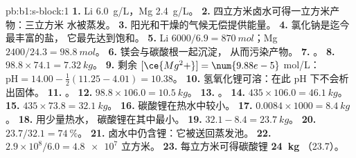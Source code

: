 \begin{solution}{pb:b1:s-block:1}
\textbf{1.} Li \qty{6.0}{g/L}，Mg \qty{2.4}{g/L}。
\textbf{2.} 四立方米卤水可得一立方米产物：三立方米
水被蒸发。
\textbf{3.} 阳光和干燥的气候无偿提供能量。
\textbf{4.} 氯化钠是迄今最丰富的盐，
它最先达到饱和。
\textbf{5.} Li $6000/6.9 = \qty{870}{mol}$；Mg $2400/24.3 = \qty{98.8}{mol}$。
\textbf{6.} 镁会与碳酸根一起沉淀，
从而污染产物。
\textbf{7.} 。
\textbf{8.} $98.8 \times 74.1 = \qty{7.32}{kg}$。
\textbf{9.} 剩余 $[\ce{Mg^2+}] = \num{9.88e-5}$ mol/L：$\mathrm{pH} = 14.00 -
\frac12(11.25 - 4.01) = 10.38$。
\textbf{10.} 氢氧化锂可溶：在此 pH 下不会析出固体。
\textbf{11.} 。
\textbf{12.} $98.8 \times 106.0 = \qty{10.5}{kg}$。
\textbf{13.} 。
\textbf{14.} $435 \times 106.0 = \qty{46.1}{kg}$。
\textbf{15.} $435 \times 73.8 = \qty{32.1}{kg}$。
\textbf{16.} 碳酸锂在热水中较小。
\textbf{17.} $0.0084 \times 1000 = \qty{8.4}{kg}$。
\textbf{18.} 用少量热水，
碳酸锂在其中最小。
\textbf{19.} $32.1 - 8.4 = \qty{23.7}{kg}$。
\textbf{20.} $23.7/32.1 = \qty{74}{\percent}$。
\textbf{21.} 卤水中仍含锂：它被送回蒸发池。
\textbf{22.} $2.9 \times 10^8/6.0 = \num{4.8e7}$ 立方米。
\textbf{23.} 每立方米可得碳酸锂 \textbf{\qty{24}{kg}}
（23.7）。
\end{solution}
